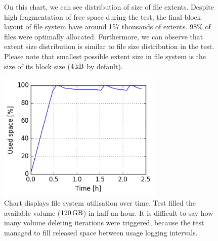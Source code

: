 \documentclass[
  color, %
  table, %
  lof,   %
  lot,   %
]{fithesis3}
\begin{document}
\begin{figure}[h]
    \centering
    \caption[Size distribution of file extents of XFS during testing on SSD with regular trimming]{On this chart, we can see distribution of size of file extents. Despite high fragmentation of free space during the test, the final block layout of file system have around 157 thousands of extents. 98\% of files were optimally allocated. Furthermore, we can observe that extent size distribution is similar to file size distribution in the test. Please note that smallest possible extent size in file system is the size of its block size ($\SI{4}{\kilo\byte}$ by default).}
    \label{fig:used_xfs_ssd_trim}
\end{figure}

\begin{figure}[!h]
    \begin{minipage}{\textwidth}
        \centering
        \includegraphics[width=0.7\textwidth]{../charts/SSD_xfs_trim/usage.png}
        \caption[Usage of available space of XFS during testing on SSD with regular trimming]{Chart displays file system utilisation over time. Test filled the available volume ($\SI{120}{\giga\byte}$) in half an hour. It is difficult to say how many volume deleting iterations were triggered, because the test managed to fill released space between usage logging intervals.}
\label{fig:usage_xfs_ssd_trim}
    \end{minipage}
\end{figure}
\end{document}
